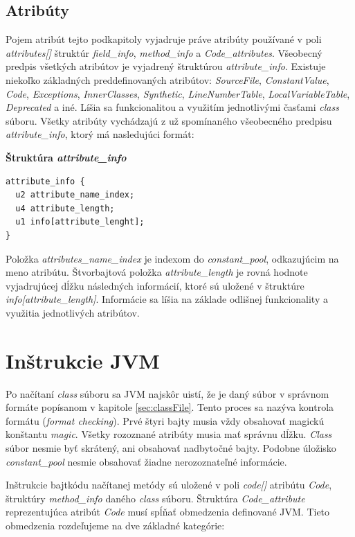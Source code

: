 \documentclass[11pt,final,oneside]{fithesis}
\newenvironment{example}[1]
{
\vspace{3mm}
\noindent\textbf{#1}
\vspace{2mm}
}
{
\vspace{3mm}
}
\begin{document}
\subsection{Atribúty}
\label{sec:attributes}
Pojem atribút tejto podkapitoly vyjadruje práve atribúty používané v poli
\textit{attributes[]} štruktúr \textit{field\_info}, \textit{method\_info} a
\textit{Code\_attributes}. Všeobecný predpis všetkých atribútov je vyjadrený
štruktúrou \textit{attribute\_info}. Existuje niekoľko základných
preddefinovaných atribútov: \textit{SourceFile}, \textit{ConstantValue},
\textit{Code}, \textit{Exceptions}, \textit{InnerClasses}, \textit{Synthetic},
\textit{LineNumberTable}, \textit{LocalVariableTable}, \textit{Deprecated} a
iné. Líšia sa funkcionalitou a využitím jednotlivými časťami \textit{class}
súboru. Všetky atribúty vychádzajú z už spomínaného všeobecného predpisu
\textit{attribute\_info}, ktorý má nasledujúci formát:

\begin{example}{Štruktúra \textit{attribute\_info}}
\begin{verbatim}
attribute_info {
  u2 attribute_name_index;
  u4 attribute_length;
  u1 info[attribute_lenght];
}
\end{verbatim}
\end{example}

Položka \textit{attributes\_name\_index} je indexom do \textit{constant\_pool},
odkazujúcim na meno atribútu. Štvorbajtová položka \textit{attribute\_length} 
je rovná hodnote vyjadrujúcej dĺžku následných informácií, ktoré sú uložené v 
štruktúre \textit{info[attribute\_length]}. Informácie sa líšia na základe 
odlišnej funkcionality a využitia jednotlivých atribútov.

\section{Inštrukcie JVM}
Po načítaní \textit{class} súboru sa JVM najskôr uistí, že je daný
súbor v správnom formáte popísanom v kapitole \ref{sec:classFile}. Tento 
proces sa nazýva kontrola formátu (\textit{format checking}). Prvé štyri bajty 
musia vždy obsahovať magickú konštantu \textit{magic}. Všetky rozoznané 
atribúty musia mať správnu dĺžku. \textit{Class} súbor nesmie byť skrátený, 
ani obsahovať nadbytočné bajty. Podobne úložisko \textit{constant\_pool} 
nesmie obsahovať žiadne nerozoznateľné informácie. 

Inštrukcie bajtkódu načítanej metódy sú uložené v poli \textit{code[]}
atribútu \textit{Code}, štruktúry \textit{method\_info} daného \textit{class}
súboru. Štruktúra \textit{Code\_attribute} reprezentujúca atribút \textit{Code}
musí spĺňať obmedzenia definované JVM. Tieto obmedzenia rozdeľujeme na dve
základné kategórie: 
\end{document}
